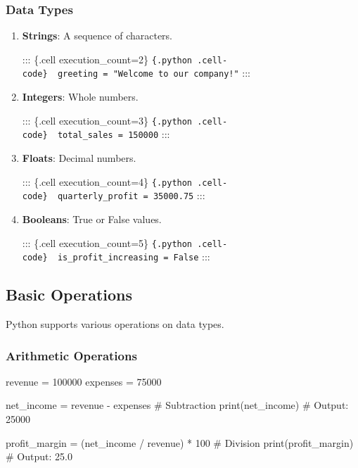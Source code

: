 \documentclass[
  letterpaper,
  DIV=11,
  numbers=noendperiod]{scrreprt}
\newenvironment{Shaded}{\begin{snugshade}}{\end{snugshade}}
\newcommand{\BuiltInTok}[1]{\textcolor[rgb]{0.00,0.23,0.31}{#1}}
\newcommand{\CommentTok}[1]{\textcolor[rgb]{0.37,0.37,0.37}{#1}}
\newcommand{\DecValTok}[1]{\textcolor[rgb]{0.68,0.00,0.00}{#1}}
\newcommand{\NormalTok}[1]{\textcolor[rgb]{0.00,0.23,0.31}{#1}}
\newcommand{\OperatorTok}[1]{\textcolor[rgb]{0.37,0.37,0.37}{#1}}
\begin{document}
\subsubsection{Data Types}\label{data-types}

\begin{enumerate}
\def\labelenumi{\arabic{enumi}.}
\item
  \textbf{Strings}: A sequence of characters.

  ::: \{.cell execution\_count=2\}
  \texttt{\{.python\ .cell-code\}\ \ greeting\ =\ "Welcome\ to\ our\ company!"}
  :::
\item
  \textbf{Integers}: Whole numbers.

  ::: \{.cell execution\_count=3\}
  \texttt{\{.python\ .cell-code\}\ \ total\_sales\ =\ 150000} :::
\item
  \textbf{Floats}: Decimal numbers.

  ::: \{.cell execution\_count=4\}
  \texttt{\{.python\ .cell-code\}\ \ quarterly\_profit\ =\ 35000.75} :::
\item
  \textbf{Booleans}: True or False values.

  ::: \{.cell execution\_count=5\}
  \texttt{\{.python\ .cell-code\}\ \ is\_profit\_increasing\ =\ False}
  :::
\end{enumerate}

\subsection{Basic Operations}\label{basic-operations}

Python supports various operations on data types.

\subsubsection{Arithmetic Operations}\label{arithmetic-operations}

\begin{Shaded}
\begin{Highlighting}[]
\NormalTok{revenue }\OperatorTok{=} \DecValTok{100000}
\NormalTok{expenses }\OperatorTok{=} \DecValTok{75000}

\NormalTok{net\_income }\OperatorTok{=}\NormalTok{ revenue }\OperatorTok{{-}}\NormalTok{ expenses  }\CommentTok{\# Subtraction}
\BuiltInTok{print}\NormalTok{(net\_income)  }\CommentTok{\# Output: 25000}

\NormalTok{profit\_margin }\OperatorTok{=}\NormalTok{ (net\_income }\OperatorTok{/}\NormalTok{ revenue) }\OperatorTok{*} \DecValTok{100}  \CommentTok{\# Division}
\BuiltInTok{print}\NormalTok{(profit\_margin)  }\CommentTok{\# Output: 25.0}
\end{Highlighting}
\end{Shaded}
\end{document}
